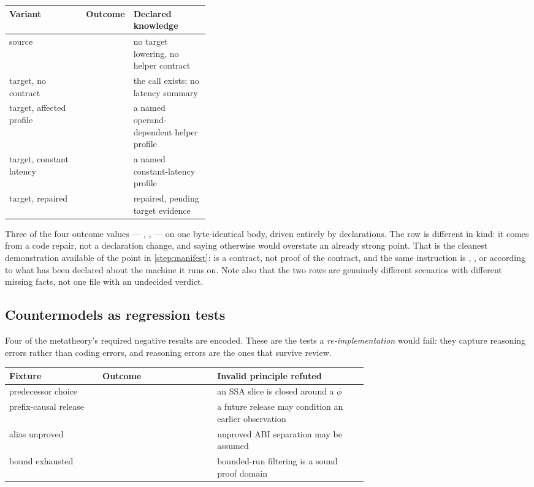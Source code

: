 \begin{center}
\begin{tabular}{@{}l l p{0.38\linewidth}@{}}
\toprule
Variant & Outcome & Declared knowledge \\
\midrule
source                   & \Unknown{}     & no target lowering, no helper contract \\
target, no contract      & \Unknown{}     & the call exists; no latency summary \\
target, affected profile & \Unsafe{}      & a named operand-dependent helper profile \\
target, constant latency & \Verified{}    & a named constant-latency profile \\
target, repaired         & \Conditional{} & repaired, pending target evidence \\
\bottomrule
\end{tabular}
\end{center}

Three of the four outcome values --- \Unknown{}, \Unsafe{}, \Verified{} --- on
one byte-identical body, driven entirely by declarations. The \Conditional{} row
is different in kind: it comes from a code repair, not a declaration change, and
saying otherwise would overstate an already strong point. That
is the cleanest demonstration available of the point in \cref{step:manifest}:
 is a contract, not proof of the contract, and the same instruction is
\Unknown{}, \Unsafe{}, or \Verified{} according to what has been declared about
the machine it runs on. Note also that the two \Unknown{} rows are genuinely
different scenarios with different missing facts, not one file with an
undecided verdict.

\subsection{Countermodels as regression tests}

Four of the metatheory's required negative results are encoded. These are the
tests a \emph{re-implementation} would fail: they capture reasoning errors rather
than coding errors, and reasoning errors are the ones that survive review.

\begin{center}
\begin{tabular}{@{}p{0.26\linewidth} l p{0.42\linewidth}@{}}
\toprule
Fixture & Outcome & Invalid principle refuted \\
\midrule
predecessor choice     & \Unsafe{}  & an SSA slice is closed around a $\phi$ \\
prefix-causal release  & \Unsafe{}  & a future release may condition an earlier observation \\
alias unproved         & \Unknown{} & unproved ABI separation may be assumed \\
bound exhausted        & \Unknown{} & bounded-run filtering is a sound proof domain \\
\bottomrule
\end{tabular}
\end{center}

